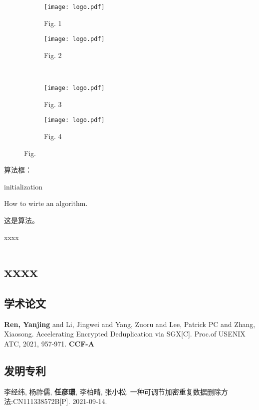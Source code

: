 \documentclass[master]{thesis-uestc}
\begin{document}
\begin{figure}[!htbp]
    \centering
    \begin{subfigure}[t]{0.35\linewidth}
        \centering
        \texttt{[image: logo.pdf]}
        \caption{Fig. 1}
        \label{fig:1-1}
    \end{subfigure}
    \begin{subfigure}[t]{0.35\linewidth}
        \centering
        \texttt{[image: logo.pdf]}
        \caption{Fig. 2}
        \label{fig:1-2}
    \end{subfigure}
    \\[6bp]
    \begin{subfigure}[t]{0.35\linewidth}
        \centering
        \texttt{[image: logo.pdf]}
        \caption{Fig. 3}
        \label{fig:1-3}
    \end{subfigure}
    \begin{subfigure}[t]{0.35\linewidth}
        \centering
        \texttt{[image: logo.pdf]}
        \caption{Fig. 4}
        \label{fig:1-4}
    \end{subfigure}
    \caption{Fig.}
    \label{fig:1}
\end{figure}
算法框：

\begin{algorithm}[H]\label{alg:1}
    initialization\;
    \caption{How to wirte an algorithm.}
\end{algorithm}

这是算法。

\thesisacknowledgement

xxxx %


\thesisappendix
\chapter{xxxx} %

\begin{thesistheaccomplish}
    \section{学术论文}
     \textbf{Ren, Yanjing} and Li, Jingwei and Yang, Zuoru and Lee, Patrick PC and Zhang, Xiaosong. Accelerating Encrypted Deduplication via SGX[C]. Proc.of USENIX ATC, 2021, 957-971. \textbf{CCF-A}
    \section{发明专利}
     李经纬, 杨祚儒, \textbf{任彦璟}, 李柏晴, 张小松. 一种可调节加密重复数据删除方法:CN111338572B[P]. 2021-09-14.
\end{thesistheaccomplish}
\end{document}
